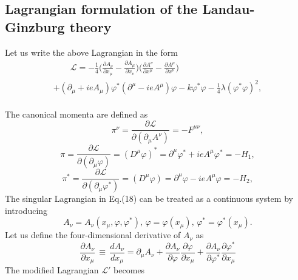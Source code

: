 \documentclass[12pt]{article}
\begin{document}
\subsection{Lagrangian formulation of the Landau- Ginzburg theory}
Let us write the above Lagrangian in the form
\begin{multline}\label{19}
\qquad \mathcal{L}=-\frac{1}{4}\bigg(\frac{\partial
A_{\nu}}{\partial x_{\mu}}-\frac{\partial A_{\mu}}{\partial
x_{\nu}}\bigg)\bigg(\frac{\partial A^{\nu}}{\partial
x^{\mu}}-\frac{\partial A^{\mu}}{\partial x^{\nu}}\bigg)\\+
(\partial_{\mu}+ieA_{\mu})\varphi^\ast
(\partial^{\mu}-ieA^{\mu})\varphi-k \varphi^{\ast}
\varphi-\frac{1}{4}\lambda (\varphi^{\ast} \varphi)^2,
\end{multline}\\
The canonical momenta are defined as
\begin{equation}\label{20}
\pi^{\nu}=\frac{\partial \mathcal{L}} {\partial
(\partial_{\mu}A^\nu)}=-F^{\mu\nu},
\end{equation}
\begin{equation}\label{21}
\pi= \frac{\partial \mathcal{L}} {\partial
(\partial_{\mu}\varphi)}=(D^{\mu}\varphi)^{\ast}=\partial^\mu{\varphi}^{\ast}+ieA^{\mu}\varphi^{\ast}=-H_1,
\end{equation}
\begin{equation}\label{22}
\pi^{\ast}= \frac{\partial \mathcal{L}} {\partial
(\partial_{\mu}\varphi^{\ast})}=(D^{\mu}\varphi)=\partial^\mu{\varphi}-ieA^{\mu}\varphi=-H_2,
\end{equation}
The singular Lagrangian in Eq.(18) can be treated as a continuous
system by introducing
\begin{equation}\label{23}
A_\nu=A_\nu(x_\mu,\varphi,\varphi^{\ast}),\,\varphi=\varphi(x_\mu),\,\varphi^{\ast}=\varphi^{\ast}(x_\mu).
\end{equation}
Let us define the four-dimensional derivative of $A_\nu$ as
\begin{equation}\label{24}
\frac{\partial A_{\nu}}{\partial x_{\mu}}\,\equiv\,\frac{d
A_{\nu}}{d x_{\mu}}=\partial_{\mu}A_{\nu}+{\frac{\partial
A_{\nu}}{\partial \varphi}\frac{\partial \varphi}{\partial
x_{\mu}}}+{\frac{\partial A_{\nu}}{\partial
\varphi^{\ast}}}{\frac{\partial \varphi^{\ast}}{\partial x_{\mu}}}
\end{equation}
The modified Lagrangian $\mathcal{L'}$ becomes
\end{document}
